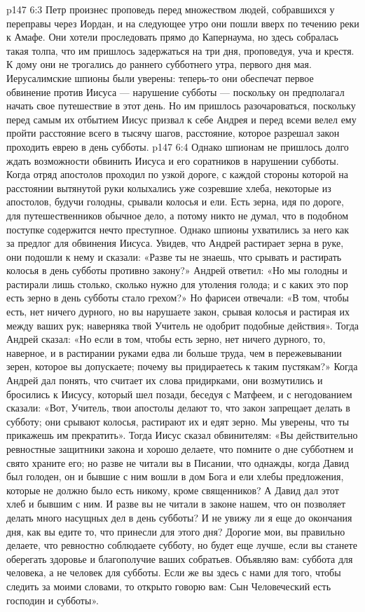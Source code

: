 \vs p147 6:3 \pc Петр произнес проповедь перед множеством людей, собравшихся у переправы через Иордан, и на следующее утро они пошли вверх по течению реки к Амафе. Они хотели проследовать прямо до Капернаума, но здесь собралась такая толпа, что им пришлось задержаться на три дня, проповедуя, уча и крестя. К дому они не трогались до раннего субботнего утра, первого дня мая. Иерусалимские шпионы были уверены: теперь\hyp{}то они обеспечат первое обвинение против Иисуса --- нарушение субботы --- поскольку он предполагал начать свое путешествие в этот день. Но им пришлось разочароваться, поскольку перед самым их отбытием Иисус призвал к себе Андрея и перед всеми велел ему пройти расстояние всего в тысячу шагов, расстояние, которое разрешал закон проходить еврею в день субботы.
\vs p147 6:4 Однако шпионам не пришлось долго ждать возможности обвинить Иисуса и его соратников в нарушении субботы. Когда отряд апостолов проходил по узкой дороге, с каждой стороны которой на расстоянии вытянутой руки колыхались уже созревшие хлеба, некоторые из апостолов, будучи голодны, срывали колосья и ели. Есть зерна, идя по дороге, для путешественников обычное дело, а потому никто не думал, что в подобном поступке содержится нечто преступное. Однако шпионы ухватились за него как за предлог для обвинения Иисуса. Увидев, что Андрей растирает зерна в руке, они подошли к нему и сказали: «Разве ты не знаешь, что срывать и растирать колосья в день субботы противно закону?» Андрей ответил: «Но мы голодны и растирали лишь столько, сколько нужно для утоления голода; и с каких это пор есть зерно в день субботы стало грехом?» Но фарисеи отвечали: «В том, чтобы есть, нет ничего дурного, но вы нарушаете закон, срывая колосья и растирая их между ваших рук; наверняка твой Учитель не одобрит подобные действия». Тогда Андрей сказал: «Но если в том, чтобы есть зерно, нет ничего дурного, то, наверное, и в растирании руками едва ли больше труда, чем в пережевывании зерен, которое вы допускаете; почему вы придираетесь к таким пустякам?» Когда Андрей дал понять, что считает их слова придирками, они возмутились и бросились к Иисусу, который шел позади, беседуя с Матфеем, и с негодованием сказали: «Вот, Учитель, твои апостолы делают то, что закон запрещает делать в субботу; они срывают колосья, растирают их и едят зерно. Мы уверены, что ты прикажешь им прекратить». Тогда Иисус сказал обвинителям: «Вы действительно ревностные защитники закона и хорошо делаете, что помните о дне субботнем и свято храните его; но разве не читали вы в Писании, что однажды, когда Давид был голоден, он и бывшие с ним вошли в дом Бога и ели хлебы предложения, которые не должно было есть никому, кроме священников? А Давид дал этот хлеб и бывшим с ним. И разве вы не читали в законе нашем, что он позволяет делать много насущных дел в день субботы? И не увижу ли я еще до окончания дня, как вы едите то, что принесли для этого дня? Дорогие мои, вы правильно делаете, что ревностно соблюдаете субботу, но будет еще лучше, если вы станете оберегать здоровье и благополучие ваших собратьев. Объявляю вам: суббота для человека, а не человек для субботы. Если же вы здесь с нами для того, чтобы следить за моими словами, то открыто говорю вам: Сын Человеческий есть господин и субботы».
